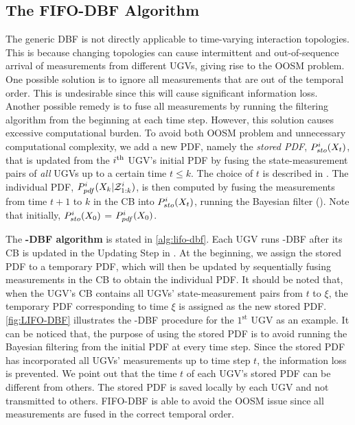 	\subsection{The FIFO-DBF Algorithm}
	The generic DBF is not directly applicable to time-varying interaction topologies. 
	This is because changing topologies can cause intermittent and out-of-sequence arrival of measurements from different UGVs, giving rise to the OOSM problem.
	One possible solution is to ignore all measurements that are out of the temporal order.
	This is undesirable since this will cause significant information loss.
	Another possible remedy is to fuse all measurements by running the filtering algorithm from the beginning at each time step.
	\textcolor{\revcol}{However, this solution causes excessive computational burden.}
	To avoid both OOSM problem and unnecessary computational complexity, we add a new PDF, namely the \textit{stored PDF}, $P^{i}_{sto}(X_t)$, that is updated from the $i^\text{th}$ UGV's initial PDF by fusing the state-measurement pairs of \textit{all} UGVs up to a certain time $t\le k$.
	The choice of $t$ is described in .
	The individual PDF, $P^i_{pdf}(X_k|\mathcal{Z}^i_{1:k})$, is then computed by fusing the measurements from time $t+1$ to $k$ in the CB into $P^i_{sto}(X_t)$, running the Bayesian filter ().
	Note that initially, $P^{i}_{sto}(X_0)$ = $P^i_{pdf}(X_0)$.
	
	The \textbf{\proto-DBF algorithm} is stated in \cref{alg:lifo-dbf}.
	Each UGV runs \proto-DBF after its CB is updated in the Updating Step in .
	At the beginning, we assign the stored PDF to a temporary PDF, which will then be updated by sequentially fusing measurements in the CB to obtain the individual PDF.
	It should be noted that, when the UGV's CB contains all UGVs' state-measurement pairs from $t$ to $\xi$, \textcolor{\revcol}{the temporary PDF corresponding to time $\xi$ is assigned as the new stored PDF.}
	\cref{fig:LIFO-DBF} illustrates the \proto-DBF procedure for the $1^\text{st}$ UGV as an example.
	It can be noticed that, the purpose of using the stored PDF is to avoid running the Bayesian filtering from the initial PDF at every time step. 
	Since the stored PDF has incorporated all UGVs' measurements up to time step $t$, the information loss is prevented. 
	We point out that the time $t$ of each UGV's stored PDF can be different from others.
	The stored PDF is saved locally by each UGV and not transmitted to others.
	\textcolor{\revcol}{FIFO-DBF is able to avoid the OOSM issue since all measurements are fused in the correct temporal order.}
		
